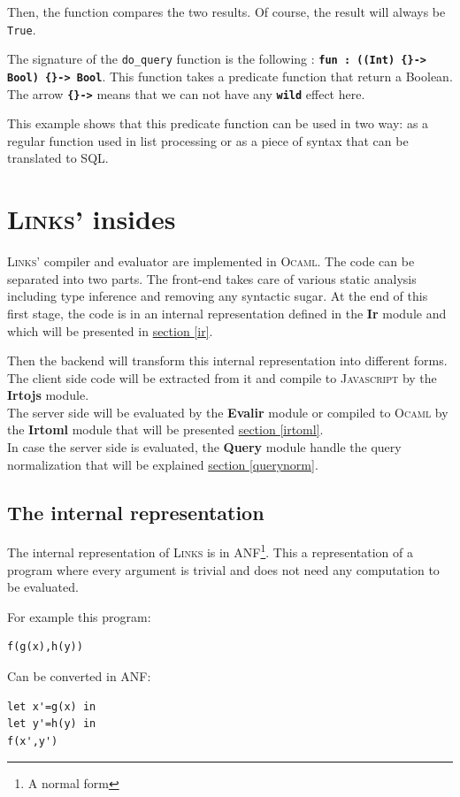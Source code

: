 \documentclass[11pt]{article}
\newcommand\mysc[1]{{\rmfamily\textsc{#1}}\xspace}
\newcommand\links{\mysc{Links}}
\newcommand\sql{\mysc{SQL}}
\newcommand\js{\mysc{Javascript}}
\newcommand\ocaml{\mysc{Ocaml}}
\newcommand\refsec[1]{\hyperref[#1]{section \ref*{#1}}}
\newcommand\sig[1]{{\tt\bf #1}}
\newcommand\code[1]{{\tt #1}}
\newcommand\module[1]{{\bf #1}}
\begin{document}
Then, the function compares the two results. Of course, the result will always be \code{True}.

The signature of the \code{do_query} function is the following : \sig{fun : ((Int) \{\}-> Bool) \{\}-> Bool}. This function takes a predicate function that return a Boolean. The arrow \sig{\{\}->} means that we can not have any \sig{wild} effect here.

This example shows that this predicate function can be used in two way: as a regular function used in list processing or as a piece of syntax that can be translated to \sql.

\section{\links' insides}

\links' compiler and evaluator are implemented in \ocaml. 
The code can be separated into two parts. 
The front-end takes care of various static analysis including type inference and removing any syntactic sugar. 
At the end of this first stage, the code is in an internal representation defined in the \module{Ir} module and which will be presented in \refsec{ir}. 

Then the backend will transform this internal representation into different forms.\\
The client side code will be extracted from it and compile to \js by the \module{Irtojs} module.\\
The server side will be evaluated by the \module{Evalir} module or compiled to \ocaml by the \module{Irtoml} module that will be presented \refsec{irtoml}.\\
In case the server side is evaluated, the \module{Query} module handle the query normalization that will be explained \refsec{querynorm}.

\subsection{The internal representation \label{ir}}

The internal representation of \links is in ANF\footnote{A normal form}. This a representation of a program where every argument is trivial and does not need any computation to be evaluated. 

For example this program:
\begin{lstlisting}[language={[Objective]Caml}]
f(g(x),h(y))
\end{lstlisting}
Can be converted in ANF:
\begin{lstlisting}[language={[Objective]Caml}]
let x'=g(x) in
let y'=h(y) in
f(x',y')
\end{lstlisting}
\end{document}
